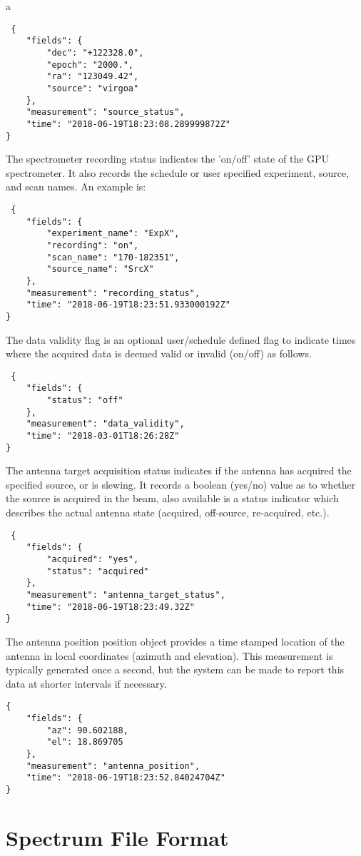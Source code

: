 a\documentclass[a4paper,14pt]{article}
\begin{document}
\begin{lstlisting}
 {
    "fields": {
        "dec": "+122328.0", 
        "epoch": "2000.", 
        "ra": "123049.42", 
        "source": "virgoa"
    }, 
    "measurement": "source_status", 
    "time": "2018-06-19T18:23:08.289999872Z"
}
\end{lstlisting}
The spectrometer recording status indicates the 'on/off' state of the GPU spectrometer. It also records the schedule or user specified experiment, source, and scan names. An example is:
\begin{lstlisting}
 {
    "fields": {
        "experiment_name": "ExpX", 
        "recording": "on", 
        "scan_name": "170-182351", 
        "source_name": "SrcX"
    }, 
    "measurement": "recording_status", 
    "time": "2018-06-19T18:23:51.933000192Z"
}
\end{lstlisting}
The data validity flag is an optional user/schedule defined flag to indicate times where the acquired data is deemed valid or invalid (on/off) as follows.
\begin{lstlisting}
 {
    "fields": {
        "status": "off"
    }, 
    "measurement": "data_validity", 
    "time": "2018-03-01T18:26:28Z"
}
\end{lstlisting}
The antenna target acquisition status indicates if the antenna has acquired the specified source, or is slewing. It records a boolean (yes/no) value as to whether the source is acquired in the beam, also available is a status indicator which 
describes the actual antenna state (acquired, off-source, re-acquired, etc.).
\begin{lstlisting}
 {
    "fields": {
        "acquired": "yes", 
        "status": "acquired"
    }, 
    "measurement": "antenna_target_status", 
    "time": "2018-06-19T18:23:49.32Z"
}
\end{lstlisting}
The antenna position position object provides a time stamped location of the antenna in local coordinates (azimuth and elevation). This measurement is typically generated once a second, but the system can be made to report this data at shorter intervals if necessary.
\begin{lstlisting}
{
    "fields": {
        "az": 90.602188, 
        "el": 18.869705
    }, 
    "measurement": "antenna_position", 
    "time": "2018-06-19T18:23:52.84024704Z"
}
\end{lstlisting}


\section{Spectrum File Format}
\end{document}
